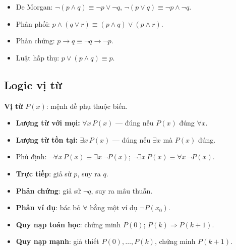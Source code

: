 \documentclass[12pt,a4paper]{article}
\begin{document}
\begin{tinhchat}[title={Các luật tương đương quan trọng}]
  \begin{itemize}
    \item De Morgan: $\neg(p \wedge q) \equiv \neg p \vee \neg q$, $\neg(p \vee q) \equiv \neg p \wedge \neg q$.
    \item Phân phối: $p \wedge (q \vee r) \equiv (p \wedge q) \vee (p \wedge r)$.
    \item Phản chứng: $p \to q \equiv \neg q \to \neg p$.
    \item Luật hấp thụ: $p \vee (p \wedge q) \equiv p$.
  \end{itemize}
\end{tinhchat}

\subsection{Logic vị từ}

\begin{dinhnghia}
  \textbf{Vị từ} $P(x)$: mệnh đề phụ thuộc biến.
  \begin{itemize}
    \item \textbf{Lượng từ với mọi:} $\forall x\, P(x)$ --- đúng nếu $P(x)$ đúng $\forall x$.
    \item \textbf{Lượng từ tồn tại:} $\exists x\, P(x)$ --- đúng nếu $\exists x$ mà $P(x)$ đúng.
    \item Phủ định: $\neg\forall x\,P(x) \equiv \exists x\,\neg P(x)$; $\neg\exists x\,P(x) \equiv \forall x\,\neg P(x)$.
  \end{itemize}
\end{dinhnghia}

\begin{phuongphap}[title={Phương pháp chứng minh}]
  \begin{itemize}
    \item \textbf{Trực tiếp}: giả sử $p$, suy ra $q$.
    \item \textbf{Phản chứng}: giả sử $\neg q$, suy ra mâu thuẫn.
    \item \textbf{Phản ví dụ}: bác bỏ $\forall$ bằng một ví dụ $\neg P(x_0)$.
    \item \textbf{Quy nạp toán học}: chứng minh $P(0)$; $P(k) \Rightarrow P(k+1)$.
    \item \textbf{Quy nạp mạnh}: giả thiết $P(0), \ldots, P(k)$, chứng minh $P(k+1)$.
  \end{itemize}
\end{phuongphap}
\end{document}
